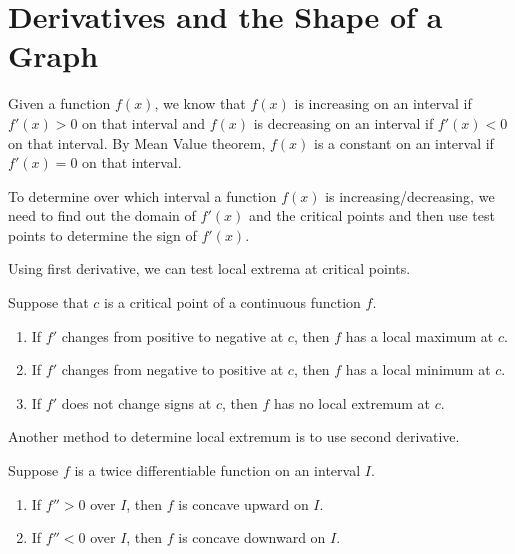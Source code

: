 \documentclass[
  en,11pt,simple]{elegantbook}
\begin{document}
\hypertarget{derivatives-and-the-shape-of-a-graph}{%
\section{Derivatives and the Shape of a Graph}\label{derivatives-and-the-shape-of-a-graph}}

Given a function \(f(x)\), we know that \(f(x)\) is increasing on an interval if \(f'(x)>0\) on that interval and \(f(x)\) is decreasing on an interval if \(f'(x)<0\) on that interval. By Mean Value theorem, \(f(x)\) is a constant on an interval if \(f'(x)=0\) on that interval.

To determine over which interval a function \(f(x)\) is increasing/decreasing, we need to find out the domain of \(f'(x)\) and the critical points and then use test points to determine the sign of \(f'(x)\).

Using first derivative, we can test local extrema at critical points.

\begin{theorem}
Suppose that \(c\) is a critical point of a continuous function \(f\).

\begin{enumerate}
\def\labelenumi{\arabic{enumi}.}

\item
  If \(f'\) changes from positive to negative at \(c\), then \(f\) has a local maximum at \(c\).
\item
  If \(f'\) changes from negative to positive at \(c\), then \(f\) has a local minimum at \(c\).
\item
  If \(f'\) does not change signs at \(c\), then \(f\) has no local extremum at \(c\).
\end{enumerate}
\end{theorem}

Another method to determine local extremum is to use second derivative.

\begin{theorem}
Suppose \(f\) is a twice differentiable function on an interval \(I\).

\begin{enumerate}
\def\labelenumi{\arabic{enumi}.}

\item
  If \(f''>0\) over \(I\), then \(f\) is concave upward on \(I\).
\item
  If \(f''<0\) over \(I\), then \(f\) is concave downward on \(I\).
\end{enumerate}
\end{theorem}
\end{document}
